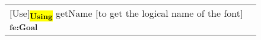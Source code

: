 \begin{figure}[H]
\centering
\begin{footnotesize}
\begingroup
\setlength{\tabcolsep}{12pt} %
\begin{tabular}{l}
    

    $\big[$Use$\big]$\textsubscript{\ttfamily \hl{\textbf{Using}}} getName $\big[$to get the logical name of the font$\big]$\textsubscript{\ttfamily  \color{rufous} \textbf{fe:Goal}}  \\



\end{tabular}
\endgroup
\end{footnotesize}
\end{figure}
    